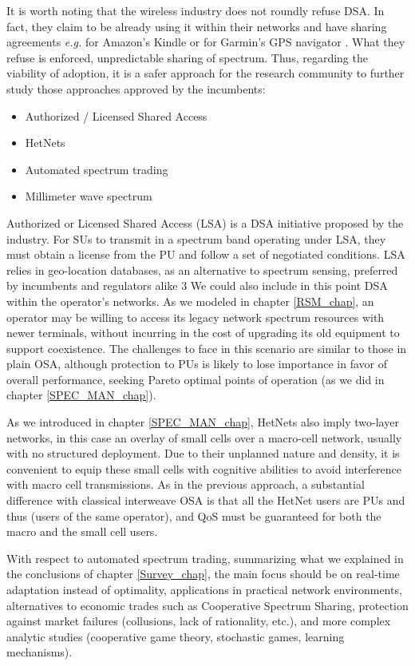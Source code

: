 It is worth noting that the wireless industry does not roundly refuse DSA. In fact, they claim to be already using it within their networks and have sharing agreements \textit{e.g.} for Amazon's Kindle or for Garmin's GPS navigator \cite{CTIA2011}. What they refuse is enforced, unpredictable sharing of spectrum. Thus, regarding the viability of adoption, it is a safer approach for the research community to further study those approaches approved by the incumbents:
\begin{itemize}
\item Authorized / Licensed Shared Access  
\item HetNets
\item Automated spectrum trading
\item Millimeter wave spectrum
\end{itemize}

Authorized or Licensed Shared Access (LSA) is a DSA initiative proposed by the industry. For SUs to transmit in a spectrum band operating under LSA, they must obtain a license from the PU and follow a set of negotiated conditions. LSA relies in geo-location databases, as an alternative to spectrum sensing, preferred by incumbents and regulators alike 3 %
We could also include in this point DSA within the operator's networks. As we modeled in chapter \ref{RSM_chap}, an operator may be willing to access its legacy network spectrum resources with newer terminals, without incurring in the cost of upgrading its old equipment to support coexistence. The challenges to face in this scenario are similar to those in plain OSA, although protection to PUs is likely to lose importance in favor of overall performance, seeking Pareto optimal points of operation (as we did in chapter \ref{SPEC_MAN_chap}). 

As we introduced in chapter \ref{SPEC_MAN_chap}, HetNets also imply two-layer networks, in this case an overlay of small cells over a macro-cell network, usually with no structured deployment. Due to their unplanned nature and density, it is convenient to equip these small cells with cognitive abilities to avoid interference with macro cell transmissions. As in the previous approach, a substantial difference with classical interweave OSA is that all the HetNet users are PUs and thus (users of the same operator), and QoS must be guaranteed for both the macro and the small cell users. 

With respect to automated spectrum trading, summarizing what we explained in the conclusions of chapter \ref{Survey_chap}, the main focus should be on real-time adaptation instead of optimality, applications in practical network environments, alternatives to economic trades such as Cooperative Spectrum Sharing, protection against market failures (collusions, lack of rationality, etc.), and more complex analytic studies (cooperative game theory, stochastic games, learning mechanisms).

